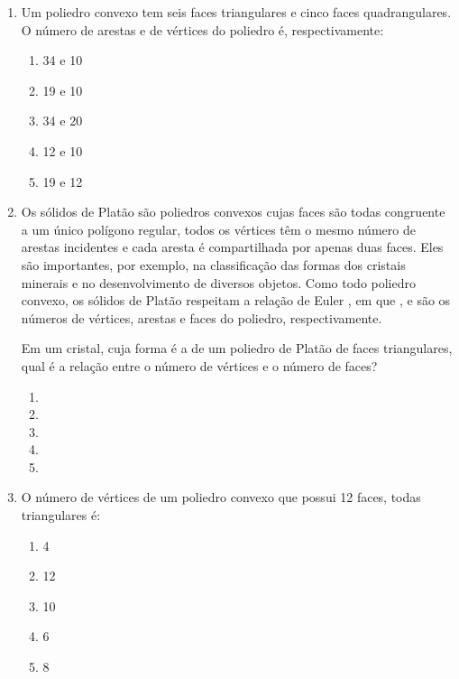 \documentclass[oneside,a4paper,12pt]{article}
\begin{document}
\begin{enumerate}
\begin{enumerate}
\item \m{3\pi}
\item \m{12\pi}
\item \m{36\pi}
\item \m{64\pi}
\item \m{108\pi}
\end{enumerate}

\item  Um poliedro convexo tem seis faces triangulares e cinco faces quadrangulares. O número de arestas e de vértices do poliedro é, respectivamente:
\begin{enumerate}
\item 34 e 10
\item 19 e 10
\item 34 e 20
\item 12 e 10
\item 19 e 12
\end{enumerate}

\item Os sólidos de Platão são poliedros convexos cujas faces são todas congruente a  um único polígono regular, todos os vértices têm o mesmo número de arestas incidentes e cada aresta é compartilhada por apenas duas faces. Eles são importantes, por exemplo, na classificação das formas dos cristais minerais e no desenvolvimento de diversos objetos. Como todo poliedro convexo, os sólidos de Platão respeitam a relação de Euler , em que ,  e  são os números de vértices, arestas e faces do poliedro, respectivamente.

Em um cristal, cuja forma é a de um poliedro de Platão de faces triangulares, qual é a relação entre o número de vértices e o número de faces?

\begin{enumerate}
\item {}
\item {}
\item {}
\item {}
\item {}
\end{enumerate}

\item O número de vértices de um poliedro convexo que possui 12 faces, todas triangulares é:
\begin{enumerate}
\item 4
\item 12
\item 10
\item 6
\item 8 
\end{enumerate}


\end{enumerate}
\end{document}
